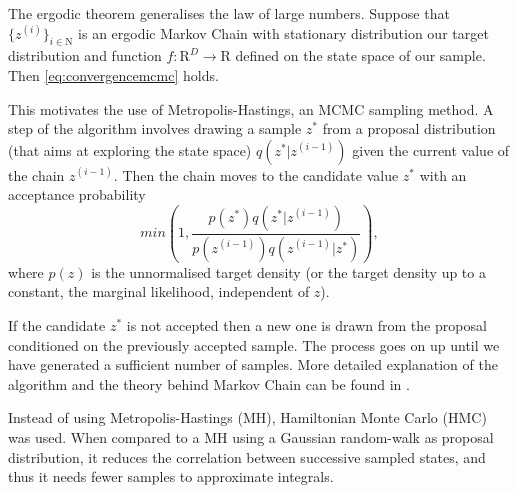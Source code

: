    The ergodic theorem generalises the law of large numbers. Suppose that $\{z^{(i)}\}_{i \in \mathrm{N}}$ is an ergodic Markov Chain with stationary distribution our target distribution and function $f:\mathrm{R}^D \rightarrow \mathrm{R}$ defined on the state space of our sample. Then \eqref{eq:convergencemcmc} holds.
   
   This motivates the use of Metropolis-Hastings, an MCMC sampling method. A step of the algorithm involves drawing a sample $z^*$ from a proposal distribution (that aims at exploring the state space) $q(z^*|z^{(i-1)})$ given the current value of the chain $z^{(i-1)}$. Then the chain moves to the candidate value $z^*$ with an acceptance probability 
   \begin{equation}
   	min\left( 1,\frac{p(z^*)q(z^*|z^{(i-1)})}{p(z^{(i-1)})q(z^{(i-1)}|z^*)}\right),
   \end{equation} 
   where $p(z)$ is the unnormalised target density (or the target density up to a constant, the marginal likelihood, independent of $z$).
   
   If the candidate $z^*$ is not accepted then a new one is drawn from the proposal conditioned on the previously accepted sample. The process goes on up until we have generated a sufficient number of samples. More detailed explanation of the algorithm and the theory behind Markov Chain can be found in \cite{lange_markov_2010}.
   
	Instead of using Metropolis-Hastings (MH), Hamiltonian Monte Carlo (HMC) was used. When compared to a MH using a Gaussian random-walk as proposal distribution, it reduces the correlation between successive sampled states, and thus it needs fewer samples to approximate integrals.
	
	
	
   
%   
%   
%   	
%   
%   

